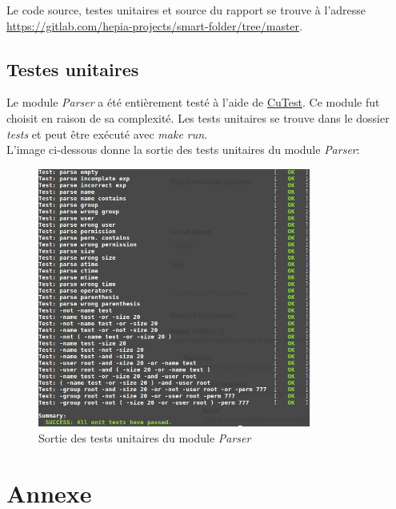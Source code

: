 \documentclass[11pt, a4paper]{article}
\begin{document}
Le code source, testes unitaires et source du rapport se trouve à l'adresse \url{https://gitlab.com/hepia-projects/smart-folder/tree/master}. \\

\subsection{Testes unitaires}

Le module \textit{Parser} a été entièrement testé à l'aide de \href{http://cutest.sourceforge.net/}{CuTest}.
Ce module fut choisit en raison de sa complexité.
Les tests unitaires se trouve dans le dossier \textit{tests} et peut être exécuté avec \textit{make run}. \\

L'image ci-dessous donne la sortie des tests unitaires du module \textit{Parser}:

\begin{figure}[H]
    \begin{center}
        \includegraphics[width=0.8\textwidth]{unit_test_result.jpg}
    \end{center}
    \caption{Sortie des tests unitaires du module \textit{Parser}}
    \label{Sortie des tests unitaires du module Parser}
\end{figure}

\newpage

\section{Annexe}
\end{document}
